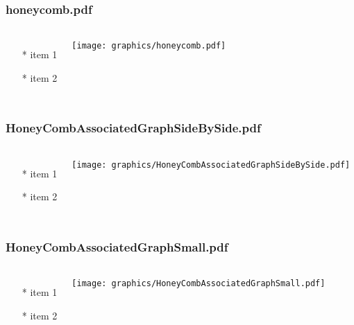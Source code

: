\begin{frame} \frametitle{honeycomb.pdf}
    \begin{columns}[c]
        \begin{itemize}
            \item[*] item 1
            \item[*] item 2
        \end{itemize}
        \begin{minipage}{\linewidth}
            \begin{center}
            \texttt{[image: graphics/honeycomb.pdf]}
            \label{gfx:honeycomb.pdf}
            \end{center}
        \end{minipage}
    \end{columns}
\end{frame}
\begin{frame} \frametitle{HoneyCombAssociatedGraphSideBySide.pdf}
    \begin{columns}[c]
        \begin{itemize}
            \item[*] item 1
            \item[*] item 2
        \end{itemize}
        \begin{minipage}{\linewidth}
            \begin{center}
            \texttt{[image: graphics/HoneyCombAssociatedGraphSideBySide.pdf]}
            \label{gfx:HoneyCombAssociatedGraphSideBySide.pdf}
            \end{center}
        \end{minipage}
    \end{columns}
\end{frame}
\begin{frame} \frametitle{HoneyCombAssociatedGraphSmall.pdf}
    \begin{columns}[c]
        \begin{itemize}
            \item[*] item 1
            \item[*] item 2
        \end{itemize}
        \begin{minipage}{\linewidth}
            \begin{center}
            \texttt{[image: graphics/HoneyCombAssociatedGraphSmall.pdf]}
            \label{gfx:HoneyCombAssociatedGraphSmall.pdf}
            \end{center}
        \end{minipage}
    \end{columns}
\end{frame}
